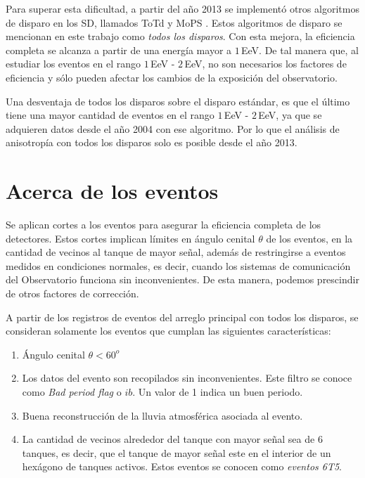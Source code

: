 Para superar esta dificultad,  a partir del año 2013  se implementó otros algoritmos de disparo en los SD, llamados ToTd y MoPS \cite{pierre2013plans}. Estos algoritmos de disparo se mencionan en este trabajo como \textit{todos los disparos}. Con esta mejora, la eficiencia completa se alcanza a partir de una energía mayor a $1\,$EeV. De tal manera que, al estudiar los eventos en el rango $1\,$EeV - $2\,$EeV,  no son necesarios los factores de eficiencia y sólo pueden afectar los cambios de la exposición del observatorio.

Una desventaja de todos los disparos sobre el disparo estándar, es que el último tiene una mayor cantidad de eventos en el rango $1\,$EeV - $2\,$EeV, ya que se adquieren datos  desde el año 2004 con ese algoritmo. Por lo que el análisis de anisotropía con todos los disparos solo es posible desde el año 2013.



\section{Acerca de los eventos} \label{filtro}

Se aplican cortes a los eventos para asegurar la eficiencia completa de los detectores. Estos cortes implican límites en ángulo cenital $\theta$ de los eventos, en la cantidad de vecinos al tanque de mayor señal, además de restringirse a eventos medidos en condiciones normales, es decir, cuando los sistemas de comunicación del Observatorio funciona sin inconvenientes. De esta manera, podemos prescindir de otros factores de corrección.

A partir de los registros de eventos del arreglo principal con todos los disparos, se consideran solamente los eventos que cumplan las siguientes características:

    \begin{enumerate}
      \item Ángulo cenital $\theta < 60^o$
      \item Los datos del evento son recopilados sin inconvenientes. Este filtro se conoce como \emph{Bad period flag} o $ib$. Un valor de 1 indica un buen periodo.
      \item Buena reconstrucción de la lluvia atmosférica asociada al evento.
      \item La cantidad de vecinos alrededor del tanque con mayor señal sea de 6 tanques, es decir, que el tanque de mayor señal este en el interior de un hexágono de tanques activos. Estos eventos se conocen como \textit{eventos 6T5}.
    \end{enumerate}



